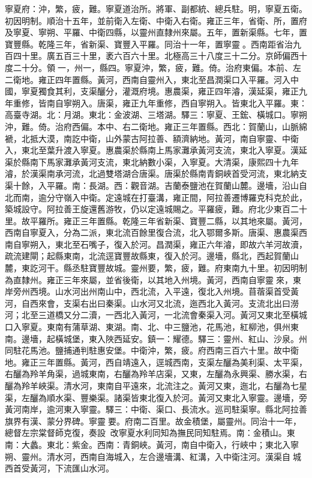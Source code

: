 \begin{pinyinscope}
寧夏府：沖，繁，疲，難。寧夏道治所。將軍、副都統、總兵駐。明，寧夏五衛。初因明制。順治十五年，並前衛入左衛、中衛入右衛。雍正三年，省衛、所，置府及寧夏、寧朔、平羅、中衛四縣，以靈州直隸州來屬。五年，置新渠縣。七年，置寶豐縣。乾隆三年，省新渠、寶豐入平羅。同治十一年，置寧靈。西南距省治九百四十里。廣五百三十里，袤六百六十里。北極高三十八度三十二分。京師偏西十度二十分。領一，州一，縣四。寧夏沖，繁，疲，難。倚。治府東偏。本前、左二衛地。雍正四年置縣。黃河，西南自靈州入，東北至昌潤渠口入平羅。河入中國，寧夏獨食其利，支渠釃分，灌溉府境。惠農渠，雍正四年濬，漢延渠，雍正九年重修，皆南自寧朔入。唐渠，雍正九年重修，西自寧朔入。皆東北入平羅。東：高臺寺湖。北：月湖。東北：金波湖、三塔湖。驛三：寧夏、王鋐、橫城口。寧朔沖，難。倚。治府西偏。本中、右二衛地。雍正三年置縣。西北：賀蘭山，山脈綿褫，北抵大漠，南訖中衛，山外蒙古阿拉善、額濟納地。黃河，南自寧靈、中衛入，東北至葉升渡入寧夏。惠農渠於縣南上馬家灘承黃河支流，東北入寧夏。漢延渠於縣南下馬家灘承黃河支流，東北納數小渠，入寧夏。大清渠，康熙四十九年濬，於漢渠南承河流，北過雙塔湖合唐渠。唐渠於縣南青銅峽首受河流，東北納支渠十餘，入平羅。南：長湖。西：觀音湖。吉蘭泰鹽池在賀蘭山麓。邊墻，沿山自北而南，逾分守嶺入中衛。定遠城在打臺溝，雍正間，阿拉善遷博羅克科克於此，築城設守。阿拉善王旋還舊游牧，仍以定遠城賜之。平羅疲，難。府北少東百二十里。故平羅所。雍正三年置縣。乾隆三年省新渠、寶豐二縣，以其地來屬。黃河，西南自寧夏入，分為二派，東北流百餘里復合流，北入鄂爾多斯。唐渠、惠農渠西南自寧朔入，東北至石嘴子，復入於河。昌潤渠，雍正六年濬，即故六羊河故瀆，疏流建閘；起縣東南，北流逕寶豐故縣東，復入於河。邊墻，縣北，西起賀蘭山麓，東訖河干。縣丞駐寶豐故城。靈州要，繁，疲，難。府東南九十里。初因明制為直隸州。雍正三年來屬，並省後衛，以其地入州境。黃河，西南自寧靈來，東岸旁州西境。山水河出州南山中，西北流，入平遠，復北入州境。苜蓿渠首受黃河，自西來會，支渠右出曰秦渠。山水河又北流，迤西北入黃河。支流北出曰澇河；北至三道橋又分二瀆，一西北入黃河，一北流會秦渠入河。黃河又東北至橫城口入寧夏。東南有蒲草湖、東湖。南、北、中三鹽池，花馬池，紅柳池，俱州東南。邊墻，起橫城堡，東入陜西延安。鎮一：耀德。驛三：靈州、紅山、沙泉。州同駐花馬池。鹽捕通判駐惠安堡。中衛沖，繁，疲。府西南三百六十里。故中衛地。雍正三年置縣。黃河，西自靖遠入，逕城西南，支渠左釃為美利渠、太平渠，右釃為羚羊角渠，過城東南，右釃為羚羊店渠，又東，左釃為永興渠、勝水渠，右釃為羚羊峽渠。清水河，東南自平遠來，北流注之。黃河又東，迤北，右釃為七星渠，左釃為順水渠、豐樂渠。諸渠皆東北復入於河。黃河又東北入寧靈。邊墻，旁黃河南岸，逾河東入寧靈。驛三：中衛、渠口、長流水。巡司駐渠寧。縣北阿拉善旗界有漢、蒙分界碑。寧靈要。府南二百里。故金積堡，屬靈州。同治十一年，總督左宗棠督師克復，奏設，改寧夏水利同知為撫民同知駐焉。南：金積山。東南：大蠡。東北：紫金。西南：青銅峽。黃河，南自中衛入，行峽中；東北入寧朔、靈州。清水河，西南自海城入，左合邊墻溝、紅溝，入中衛注河。漢渠自城西首受黃河，下流匯山水河。


\end{pinyinscope}
